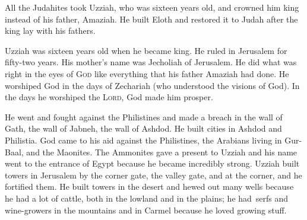 
\begin{inparaenum}
   All the Judahites took Uzziah, who was sixteen years old, and crowned him king instead of his father, Amaziah.%
   He built Eloth and restored it to Judah after the king lay with his fathers.%
  
   Uzziah was sixteen years old when he became king. He ruled in Jerusalem for fifty-two years. His mother's name was Jecholiah of Jerusalem.%
   He did what was right in the eyes of \textsc{God} like everything that his father Amaziah had done.%
   He worshiped God in the days of Zechariah (who understood the visions of God). In the days he worshiped the \textsc{Lord}, God made him prosper.%
  
   He went and fought against the Philistines and made a breach in the wall of Gath, the wall of Jabneh, the wall of Ashdod. He built cities in Ashdod and Philistia.%
   God came to his aid against the Philistines, the Arabians living in Gur-Baal, and the Maonites.%
   The Ammonites gave a present to Uzziah and his name went to the entrance of Egypt because he became incredibly strong.%
   Uzziah built towers in Jerusalem by the corner gate, the valley gate, and at the corner, and he fortified them.%
   He built towers in the desert and hewed out many wells because he had a lot of cattle, both in the lowland and in the plains; he had\understood\ serfs and wine-growers in the mountains and in Carmel because he loved growing stuff.%
  

\end{inparaenum}
